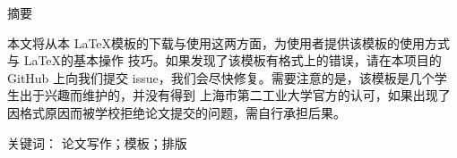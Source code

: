 \begin{center}
  \sffamily{}
  \titleCN
\end{center}

\begin{center}
  \heiti{}
  摘要
\end{center}


本文将从本 \LaTeX 模板的下载与使用这两方面，为使用者提供该模板的使用方式与 \LaTeX 的基本操作
技巧。如果发现了该模板有格式上的错误，请在本项目的 {\ttfamily GitHub} 上向我们提交
{\ttfamily issue}，我们会尽快修复。需要注意的是，该模板是几个学生出于兴趣而维护的，并没有得到
上海市第二工业大学官方的认可，如果出现了因格式原因而被学校拒绝论文提交的问题，需自行承担后果。

{\noindent\heiti 关键词：}
论文写作；模板；排版

\newpage
